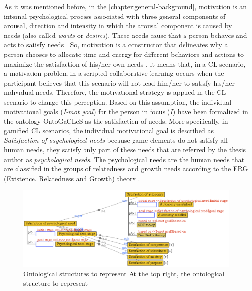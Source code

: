 As it was mentioned before, in the \autoref{chapter:general-background}, motivation is an internal psychological process associated with three general components of arousal, direction and intensity in which the arousal component is caused by needs (also called \emph{wants} or \emph{desires}).
These needs cause that a person behaves and acts to satisfy needs \cite{MitchellDaniels2003}.
So, motivation is a constructor that delineates why a person chooses to allocate time and energy for different behaviors and actions to maximize the satisfaction of his/her own needs \cite{PritchardAshwood2008}.
It means that, in a CL scenario, a motivation problem in a scripted collaborative learning occurs when the participant believes that this scenario will not lead him/her to satisfy his/her individual needs.
Therefore, the motivational strategy is applied in the CL scenario to change this perception.
Based on this assumption, the individual motivational goals (\emph{I-mot goal}) for the person in focus (\emph{I}) have been formalized in the ontology OntoGaCLeS as the satisfaction of needs.
More specifically, in gamified CL scenarios, the individual motivational goal is described as \emph{Satisfaction of psychological needs} because game elements do not satisfy all human needs, they satisfy only part of these needs that are referred by the thesis author as \emph{psychological needs}.
The psychological needs are the human needs that are classified in the groups of relatedness and growth needs according to the ERG (Existence, Relatedness and Growth) theory \cite{Alderfer1972}.

\begin{figure}[!htbp]
 \caption[Ontological structures to represent satisfaction of psychological need]{Ontological structures to represent  At the top right, the ontological structure to represent }
 \label{fig:ontological-structure-satisfaction-psychological-need}
 \centering
 \includegraphics[width=1\textwidth]{images/chap-ontogacles1/ontological-structure-satisfaction-psychological-need.png}
 \fautor
\end{figure}

